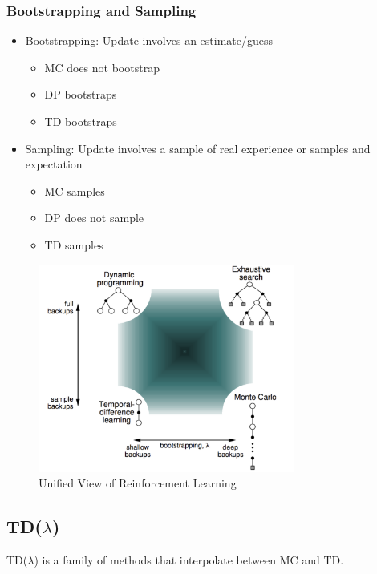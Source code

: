 \subsubsection*{Bootstrapping and Sampling}
\begin{itemize}
    \item Bootstrapping: Update involves an estimate/guess
    \begin{itemize}
        \item MC does not bootstrap
        \item DP bootstraps
        \item TD bootstraps
    \end{itemize}
    \item Sampling: Update involves a sample of real experience or samples and expectation
    \begin{itemize}
        \item MC samples
        \item DP does not sample
        \item TD samples
    \end{itemize}
\end{itemize}

\begin{figure}[H]
    \centering
    \includegraphics[width=0.75\textwidth]{figures/uni-rl.png}
    \caption{Unified View of Reinforcement Learning}
    \label{fig:uni-rl}
\end{figure}

\subsection{TD(\(\lambda \))}
TD(\(\lambda \)) is a family of methods that interpolate between MC and TD.
